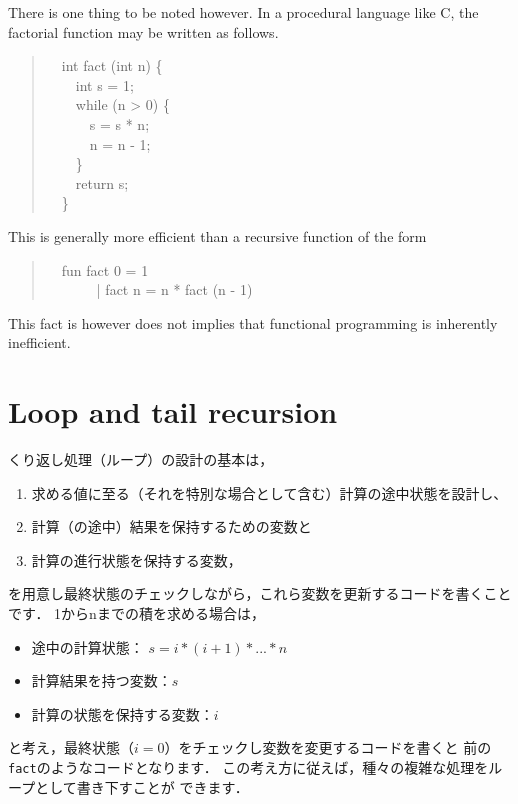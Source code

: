 \documentclass{jbook}
\newcommand{\txt}[2]{#2}
\newcommand{\myem}{\mbox{\ \ }}
\newenvironment{program}{\begin{quote}\begin{tt}}%
                        {\end{tt}\end{quote}}
\begin{document}
	There is one thing to be noted however.
	In a procedural language like C, the factorial function may be
written as follows.
\begin{program}
\myem int fact (int n) \{\\
\myem\myem   int s = 1;\\
\myem\myem   while (n > 0) \{\\
\myem\myem\myem     s = s * n;\\
\myem\myem\myem     n = n - 1;\\
\myem\myem   \}\\
\myem\myem  return s;\\
\myem \}
\end{program}
	This is generally more efficient than a recursive function of
the form
\begin{program}
\myem fun fact 0 = 1\\
\myem \ \ \ \ \ | fact n = n * fact (n - 1)
\end{program}
	This fact is however does not implies that functional
programming is inherently inefficient.
\fi%

\section{\txt{ループと末尾再帰関数}{Loop and tail recursion}}
\label{sec:tutorialTailcall}

\ifjp%
	くり返し処理（ループ）の設計の基本は，
\begin{enumerate}
\item 
求める値に至る（それを特別な場合として含む）計算の途中状態を設計し、
\item 
計算（の途中）結果を保持するための変数と
\item 
計算の進行状態を保持する変数，
\end{enumerate}
を用意し最終状態のチェックしながら，これら変数を更新するコードを書くこと
です．
	1からnまでの積を求める場合は，
\begin{itemize}
\item 
途中の計算状態：
$s = i * (i + 1) * ... * n$
\item 
計算結果を持つ変数：$s$
\item 
計算の状態を保持する変数：$i$
\end{itemize}
と考え，最終状態（$i = 0$）をチェックし変数を変更するコードを書くと
前の{\tt fact}のようなコードとなります．
	この考え方に従えば，種々の複雑な処理をループとして書き下すことが
できます．
\end{document}
